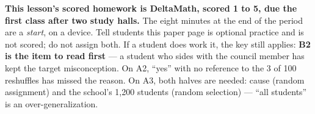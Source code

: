 \documentclass[10pt]{article}
\begin{document}
\begin{teachernote}[Homework]
\textbf{This lesson's scored homework is DeltaMath, scored 1 to 5, due the first class after two
study halls.} The eight minutes at the end of the period are a \emph{start}, on a device. Tell
students this paper page is optional practice and is not scored; do not assign both. If a student
does work it, the key still applies: \textbf{B2 is the item to read first} --- a student who sides
with the council member has kept the target misconception. On A2, ``yes'' with no reference to
the 3 of 100 reshuffles has missed the reason. On A3, both halves are needed: cause (random
assignment) and the school's 1{,}200 students (random selection) --- ``all students'' is an
over-generalization.
\end{teachernote}
\end{document}

